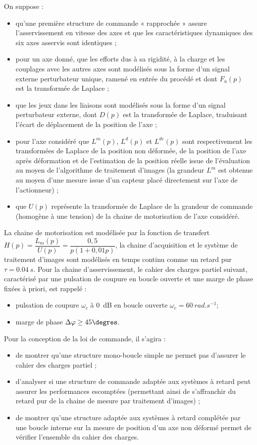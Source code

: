 \ifcolle
\else
On suppose :
\begin{itemize}
\item qu’une première structure de commande « rapprochée » assure l’asservissement en vitesse des axes et que les caractéristiques dynamiques des six axes asservis sont identiques ;
\item pour un axe donné, que les efforts dus à sa rigidité, à la charge et les couplages avec les autres axes sont modélisés sous la forme d’un signal externe perturbateur unique, ramené en entrée du procédé et dont $F_u(p)$ est la transformée de Laplace ;
\item que les jeux dans les liaisons sont modélisés sous la forme d’un signal perturbateur externe, dont $D(p)$ est la transformée de Laplace, traduisant l’écart de déplacement de la position de l’axe ;
\item pour l’axe considéré que $L^m(p)$, $L^d(p)$ et $L^{de}(p)$ sont respectivement les transformées de Laplace de la position non déformée, de la position de l’axe après déformation et de l’estimation de la position réelle issue de l’évaluation au moyen de l’algorithme de traitement d’images (la grandeur $L^m$ est obtenue au moyen d’une mesure issue d’un capteur placé directement sur l’axe de l’actionneur) ;
\item que $U(p)$ représente la transformée de Laplace de la grandeur de commande (homogène à une tension) de la chaine de motorisation de l’axe considéré.
\end{itemize}
\fi


La chaine de motorisation est modélisée par la fonction de transfert $H(p)=\dfrac{L_m(p)}{U(p)}=\dfrac{0,5}{p\left( 1+0,01 p\right)}$, la chaine d'acquisition et le système de traitement d’images sont modélisés en temps continu comme un retard pur $\tau=\SI{0,04}{s}$.
Pour la chaine d’asservissement, le cahier des charges partiel suivant, caractérisé par une pulsation de coupure en boucle ouverte et une marge de phase fixées à priori, est rappelé :
\begin{itemize}
\item pulsation de coupure $\omega_c$ à \SI{0}{dB} en boucle ouverte $\omega_c = \SI{60}{rad.s^{-1}}$;
\item marge de phase $\Delta \varphi \geq 45 \degres$.
\end{itemize}


\ifcolle
\else
Pour la conception de la loi de commande, il s’agira :
\begin{itemize}
\item de montrer qu’une structure mono-boucle simple ne permet pas d’assurer le cahier des charges partiel ;
\item d’analyser si une structure de commande adaptée aux systèmes à retard peut assurer les performances
escomptées (permettant ainsi de s’affranchir du retard pur de la chaine de mesure par traitement d’images) ;
\item de montrer qu’une structure adaptée aux systèmes à retard complétée par une boucle interne sur la mesure
de position d’un axe non déformé permet de vérifier l’ensemble du cahier des charges.
\end{itemize}

